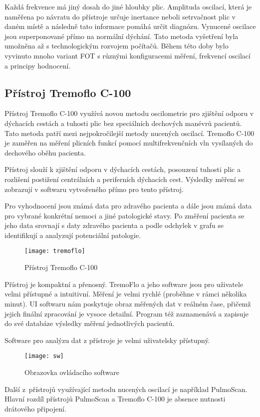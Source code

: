 Každá frekvence má jiný dosah do jiné hloubky plic. Amplituda oscilací, která je naměřena po návratu do přístroje určuje inertance neboli setrvačnost plic v daném místě a následně tato informace pomáhá určit diagnózu. \cite{Oostveen}
Vynucené oscilace jsou superponované přímo na normální dýchání. Tato metoda vyšetření byla umožněna až s technologickým rozvojem počítačů. \cite{Vlcek2018} Během této doby bylo vyvinuto mnoho variant FOT s různými konfiguracemi měření, frekvencí oscilací a principy hodnocení. 

\subsection{Přístroj Tremoflo C-100}
Přístroj Tremoflo C-100 využívá novou metodu oscilometrie pro zjištění odporu  v dýchacích cestách a tuhosti plic bez speciálních dechových manévrů pacientů. Tato metoda patří mezi nejpokročilejší metody nucených oscilací. Tremoflo C-100 je zaměřen na měření plicních funkcí pomocí multifrekvenčních vln vysílaných do dechového oběhu pacienta. \cite{Nasinec}

Přístroj slouží k zjištění odporu v dýchacích cestách, posouzení tuhosti plic a rozlišení postižení centrálních a periferních dýchacích cest. Výsledky měření se zobrazují v softwaru vytvořeného přímo pro tento přístroj. \cite{Nasinec}

Pro vyhodnocení jsou známá data pro zdravého pacienta a dále jsou známá data pro vybrané konkrétní nemoci a jiné patologické stavy.  Po změření pacienta se jeho data srovnají s daty zdravého pacienta a podle odchylek v grafu se identifikují a analyzují potenciální patologie. 

\begin{figure}[!ht]
			\centering
 			\texttt{[image: tremoflo]}
			\caption{Přístroj Tremoflo C-100 \cite{wwwpics}}
			 \label{tremoflopristroj}
 \end{figure}

Přístroj je kompaktní a přenosný. TremoFlo a jeho software jsou pro uživatele velmi přístupné a intuitivní. Měření je velmi rychlé (proběhne v rámci několika minut). UI softwaru nám poskytuje obraz měřených dat v reálném čase, přičemž jejich finální zpracování je vysoce detailní. Program též zaznamenává a zapisuje do své databáze výsledky měření jednotlivých pacientů.

Software pro analýzu dat z přístroje je velmi uživatelsky přístupný. 

\begin{figure}[!ht]
			\centering
 			\texttt{[image: sw]}
			\caption{Obrazovka ovládacího software \cite{wwwpics}}
			 \label{tremosw}
 \end{figure}

Další z~přístrojů využívající metodu nucených oscilací je například PulmoScan. Hlavní rozdíl přístrojů PulmoScan a Tremoflo C-100 je absence nutnosti drátového připojení. 